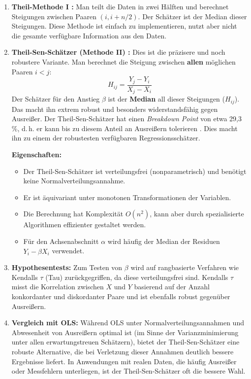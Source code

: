 \documentclass[a4paper, 11pt]{scrartcl}
\begin{document}
\begin{enumerate}
	\item \textbf{Theil-Methode I \cite{Theil1950}:} Man teilt die Daten in zwei Hälften und berechnet Steigungen zwischen Paaren $(i, i+n/2)$. Der Schätzer ist der Median dieser Steigungen. Diese Methode ist einfach zu implementieren, nutzt aber nicht die gesamte verfügbare Information aus den Daten.
	
	\item \textbf{Theil-Sen-Schätzer (Methode II) \cite{Theil1950, Sen1968}:} Dies ist die präzisere und noch robustere Variante. Man berechnet die Steigung zwischen \textbf{allen} möglichen Paaren $i < j$:
	      \begin{equation}
	      	H_{ij} = \frac{Y_j - Y_i}{X_j - X_i}
	      \end{equation}
	      Der Schätzer für den Anstieg $\beta$ ist der \textbf{Median} all dieser Steigungen ($H_{ij}$). Das macht ihn extrem robust und besonders widerstandsfähig gegen Ausreißer. Der Theil-Sen-Schätzer hat einen \textit{Breakdown Point} von etwa 29,3\,\%, d.\,h. er kann bis zu diesem Anteil an Ausreißern tolerieren \cite{Sen1968}. Dies macht ihn zu einem der robustesten verfügbaren Regressionsschätzer.
	      
	      \textbf{Eigenschaften:}
	      \begin{itemize}
	      	\item Der Theil-Sen-Schätzer ist verteilungsfrei (nonparametrisch) und benötigt keine Normalverteilungsannahme.
	      	\item Er ist äquivariant unter monotonen Transformationen der Variablen.
	      	\item Die Berechnung hat Komplexität $O(n^2)$, kann aber durch spezialisierte Algorithmen effizienter gestaltet werden.
	      	\item Für den Achsenabschnitt $\alpha$ wird häufig der Median der Residuen $Y_i - \hat{\beta} X_i$ verwendet.
	      \end{itemize}
	      
	\item \textbf{Hypothesentests:} Zum Testen von $\beta$ wird auf rangbasierte Verfahren wie Kendalls $\tau$ \cite{Kendall1938} (Tau) zurückgegriffen, da diese verteilungsfrei sind. Kendalls $\tau$ misst die Korrelation zwischen $X$ und $Y$ basierend auf der Anzahl konkordanter und diskordanter Paare und ist ebenfalls robust gegenüber Ausreißern.
	
	\item \textbf{Vergleich mit OLS:} Während OLS unter Normalverteilungsannahmen und Abwesenheit von Ausreißern optimal ist (im Sinne der Varianzminimierung unter allen erwartungstreuen Schätzern), bietet der Theil-Sen-Schätzer eine robuste Alternative, die bei Verletzung dieser Annahmen deutlich bessere Ergebnisse liefert. In Anwendungen mit realen Daten, die häufig Ausreißer oder Messfehlern unterliegen, ist der Theil-Sen-Schätzer oft die bessere Wahl.
\end{enumerate}
\end{document}
